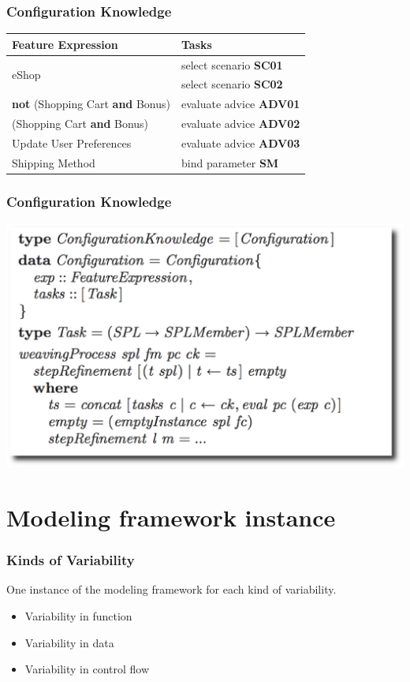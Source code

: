 \documentclass[xcolor=svgnames]{beamer}
\begin{document}
\begin{frame}
\frametitle{Configuration Knowledge}
\begin{center}
\begin{tabular}{||lp{1.4in}||}
\hline
Feature Expression  						& Tasks					 \\ \hline

\multirow{2}{*}{eShop}						& select scenario {\bf SC01} \\
										& select scenario {\bf SC02} \\	\hline
{\bf not} (Shopping Cart {\bf and} Bonus) 			& evaluate advice {\bf ADV01} \\
\hline (Shopping Cart {\bf and} Bonus) 			& evaluate advice {\bf ADV02} 	\\
\hline Update User Preferences 				& evaluate advice {\bf ADV03} \\ \hline
Shipping Method							& bind parameter {\bf SM}\\ \hline
								
\end{tabular}
\end{center}
\end{frame}

\begin{frame}
\frametitle{Configuration Knowledge}
\begin{center}
\includegraphics[scale=0.35]{img/ckFinal03.eps}
\end{center}
\end{frame}

\section{Modeling framework instance}

\begin{frame}
\frametitle{Kinds of Variability}
One instance of the modeling framework for each kind of variability.

\begin{itemize}
    \item Variability in function
    \item Variability in data
    \item Variability in control flow
\end{itemize}


\end{frame}
\end{document}
